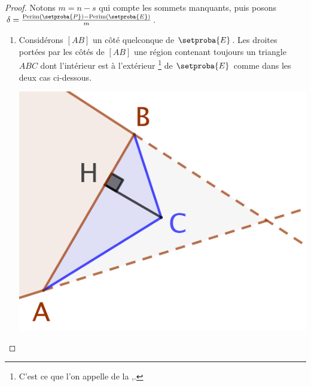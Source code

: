 \begin{proof}
	\newpage %

	Notons $m = n - s$ qui compte les sommets manquants, puis posons
	$\delta = \frac{\perim{\setproba{P}} - \perim{\setproba{E}}}{m}$.
	\begin{enumerate}
		\item \label{add-vertex-start}
		Considérons $[AB]$ un côté quelconque de $\setproba{E}$.
		Les droites portées par les côtés  de $[AB]$  une région contenant toujours un triangle $ABC$ dont l'intérieur est à l'extérieur
		\footnote{
			C'est ce que l'on appelle de la ,.
		}
		de $\setproba{E}$ comme dans les deux cas ci-dessous.
		\begin{multicols}{2}
			\centering

			\includegraphics[scale=.35]{content/polygon/sol-must-be/add-vertex-1.png}


\end{multicols}
\end{enumerate}
\end{proof}
